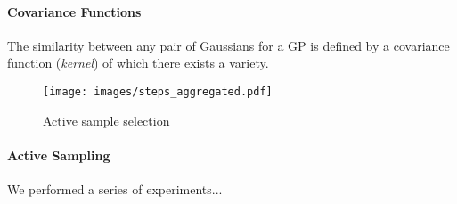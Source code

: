 \documentclass[english]{lni}
\begin{document}
\paragraph{Covariance Functions}
The similarity between any pair of Gaussians for a GP is defined by a covariance function (\emph{kernel}) of which there exists a variety.
\begin{wrapfigure}{r}{0.5\linewidth}
	\texttt{[image: images/steps\_aggregated.pdf]}
	\caption{Active sample selection}
\end{wrapfigure}

\paragraph{Active Sampling} \blindtext


We performed a series of experiments...

\clearpage
%
\end{document}
